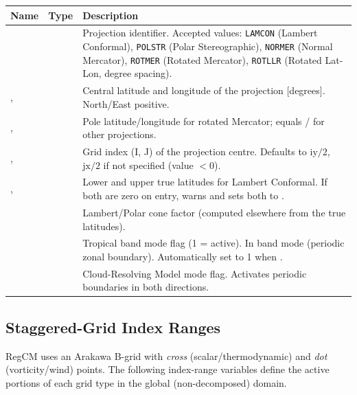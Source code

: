 \begin{longtable}{L{3cm} L{3cm} L{8cm}}
  \toprule
  \textbf{Name} & \textbf{Type} & \textbf{Description} \\
  \midrule
  \endhead
  \bottomrule
  \endfoot
   &  &
    Projection identifier. Accepted values: \texttt{LAMCON} (Lambert
    Conformal), \texttt{POLSTR} (Polar Stereographic), \texttt{NORMER}
    (Normal Mercator), \texttt{ROTMER} (Rotated Mercator),
    \texttt{ROTLLR} (Rotated Lat-Lon, degree spacing). \\
  ,  &  &
    Central latitude and longitude of the projection [degrees].
    North/East positive. \\
  ,  &  &
    Pole latitude/longitude for rotated Mercator; equals /
    for other projections. \\
  ,  &  &
    Grid index (I, J) of the projection centre. Defaults to
    $\text{iy}/2$, $\text{jx}/2$ if not specified (value $< 0$). \\
  ,  &  &
    Lower and upper true latitudes for Lambert Conformal. If both are zero
    on entry,  warns and sets both to . \\
   &  &
    Lambert/Polar cone factor (computed elsewhere from the true latitudes). \\
   &  &
    Tropical band mode flag (1 = active). In band mode 
    (periodic zonal boundary). Automatically set to 1 when . \\
   &  &
    Cloud-Resolving Model mode flag. Activates periodic boundaries in both
    directions. \\
\end{longtable}

\subsection{Staggered-Grid Index Ranges}
\label{subsec:dynparam_stagger}

RegCM uses an Arakawa B-grid with \emph{cross} (scalar/thermodynamic) and
\emph{dot} (vorticity/wind) points. The following index-range variables
define the active portions of each grid type in the global (non-decomposed)
domain.

